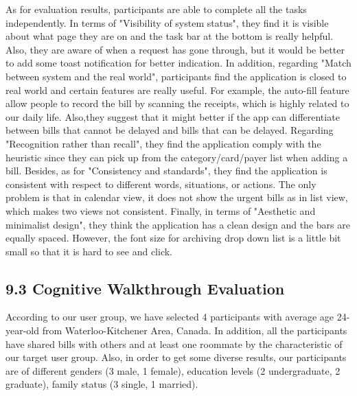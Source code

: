 \documentclass{sigchi}
\begin{document}
As for evaluation results, participants are able to complete all the tasks independently. In terms of "Visibility of system status", they find it is visible about what page they are on and the task bar at the bottom is really helpful. Also, they are aware of when a request has gone through, but it would be better to add some toast notification for better indication. In addition, regarding "Match between system and the real world", participants find the application is closed to real world and certain features are really useful. For example, the auto-fill feature allow people to record the bill by scanning the receipts, which is highly related to our daily life. Also,they suggest that it might better if the app can differentiate between bills that cannot be delayed and bills that can be delayed. Regarding "Recognition rather than recall", they find the application comply with the heuristic since they can pick up from the category/card/payer list when adding a bill. Besides, as for "Consistency and standards", they find the application is consistent with respect to different words, situations, or actions. The only problem is that in calendar view, it does not show the urgent bills as in list view, which makes two views not consistent. Finally, in terms of "Aesthetic and minimalist design", they think the application has a clean design and the bars are equally spaced. However, the font size for archiving drop down list is a little bit small so that it is hard to see and click.


\subsection{9.3 Cognitive Walkthrough Evaluation}

According to our user group, we have selected 4 participants with average age 24-year-old from Waterloo-Kitchener Area, Canada. In addition, all the participants have shared bills with others and at least one roommate by the characteristic of our target user group. Also, in order to get some diverse results, our participants are of different genders (3 male, 1 female), education levels (2 undergraduate, 2 graduate), family status (3 single, 1 married).
\end{document}
